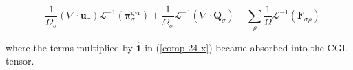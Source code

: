 \begin{equation}
    \label{comp-26-gyr}
    +\frac{1}{\Omega_\sigma}\left(\nabla\cdot{\mathbf{u}_\sigma}\right)\mathcal{L}^{-1}\left(\boldsymbol{\pi}_\sigma^\mathrm{gyr}\right)+\frac{1}{\Omega_\sigma}\mathcal{L}^{-1}\left(\nabla\cdot \mathbf{Q}_\sigma\right)-\sum_{\rho}\frac{1}{\Omega}\mathcal{L}^{-1}\left(\mathbf{F}_{\sigma\rho}\right)
\end{equation}

where the terms multiplied by $\mathbf{\hat{1}}$ in (\ref{comp-24-x}) became absorbed into the CGL tensor.

\vspace*{2.5pt}

